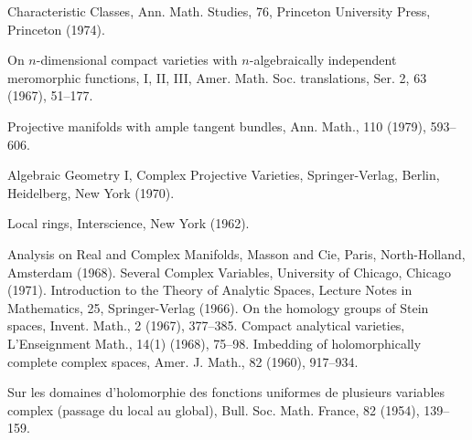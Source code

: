 \begin{sourcebibliography}
 Characteristic Classes, Ann. Math. Studies, 76, Princeton University Press, Princeton (1974).
\end{sourcebibliography}
\begin{sourcebibliography}
 On $n$-dimensional compact varieties with $n$-algebraically independent meromorphic functions, I, II, III, Amer. Math. Soc. translations, Ser. 2, 63 (1967), 51--177.
\end{sourcebibliography}
\begin{sourcebibliography}
 Projective manifolds with ample tangent bundles, Ann. Math., 110 (1979), 593--606.
\end{sourcebibliography}
\begin{sourcebibliography}
 Algebraic Geometry I, Complex Projective Varieties, Springer-Verlag, Berlin, Heidelberg, New York (1970).
\end{sourcebibliography}
\begin{sourcebibliography}
 Local rings, Interscience, New York (1962).
\end{sourcebibliography}
\begin{sourcebibliography}
 Analysis on Real and Complex Manifolds, Masson and Cie, Paris, North-Holland, Amsterdam (1968).
 Several Complex Variables, University of Chicago, Chicago (1971).
 Introduction to the Theory of Analytic Spaces, Lecture Notes in Mathematics, 25, Springer-Verlag (1966).
 On the homology groups of Stein spaces, Invent. Math., 2 (1967), 377--385.
 Compact analytical varieties, L'Enseignment Math., 14(1) (1968), 75--98.
 Imbedding of holomorphically complete complex spaces, Amer. J. Math., 82 (1960), 917--934.
\end{sourcebibliography}
\begin{sourcebibliography}
 Sur les domaines d'holomorphie des fonctions uniformes de plusieurs variables complex (passage du local au global), Bull. Soc. Math. France, 82 (1954), 139--159.
\end{sourcebibliography}
